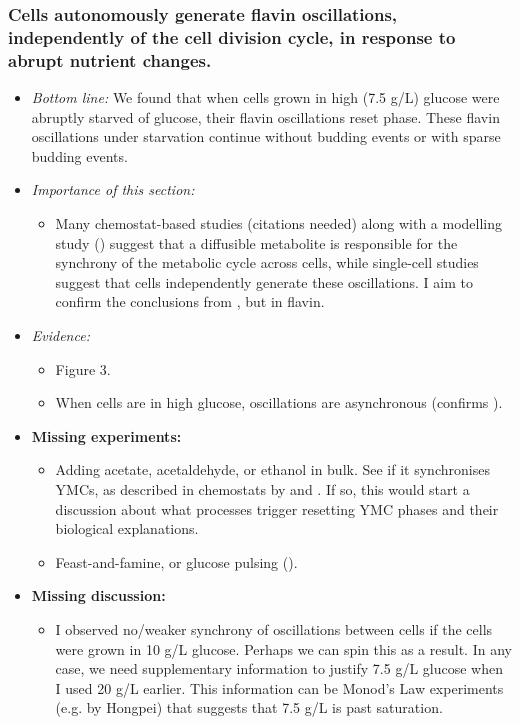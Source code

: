 \subsubsection{Cells autonomously generate flavin oscillations, independently of the cell division cycle, in response to abrupt nutrient changes.}
\label{sec:orgbeb56ba}
\begin{itemize}
\item \emph{Bottom line:} We found that when cells grown in high (7.5 g/L) glucose were abruptly starved of glucose, their flavin oscillations reset phase.  These flavin oscillations under starvation continue without budding events or with sparse budding events.
\item \emph{Importance of this section:}

\begin{itemize}
\item Many chemostat-based studies (citations needed) along with a modelling study (\cite{krishnaMinimalPushPull2018}) suggest that a diffusible metabolite is responsible for the synchrony of the metabolic cycle across cells, while single-cell studies suggest that cells independently generate these oscillations.  I aim to confirm the conclusions from \cite{papagiannakisAutonomousMetabolicOscillations2017}, but in flavin.
\end{itemize}
\item \emph{Evidence:}
\begin{itemize}
\item Figure 3.
\item When cells are in high glucose, oscillations are asynchronous (confirms \cite{papagiannakisAutonomousMetabolicOscillations2017,baumgartnerFlavinbasedMetabolicCycles2018}).
\end{itemize}

\item \textbf{Missing experiments:}
\begin{itemize}
\item Adding acetate, acetaldehyde, or ethanol in bulk.  See if it synchronises YMCs, as described in chemostats by \cite{kuangMsn2RegulateExpression2017} and \cite{krishnaMinimalPushPull2018} .  If so, this would start a discussion about what processes trigger resetting YMC phases and their biological explanations.
\item Feast-and-famine, or glucose pulsing (\cite{charvinForcedPeriodicExpression2009}).
\end{itemize}
\item \textbf{Missing discussion:}
\begin{itemize}
\item I observed no/weaker synchrony of oscillations between cells if the cells were grown in 10 g/L glucose.  Perhaps we can spin this as a result.  In any case, we need supplementary information to justify 7.5 g/L glucose when I used 20 g/L earlier.  This information can be Monod's Law experiments (e.g. by Hongpei) that suggests that 7.5 g/L is past saturation.
\end{itemize}
\end{itemize}

